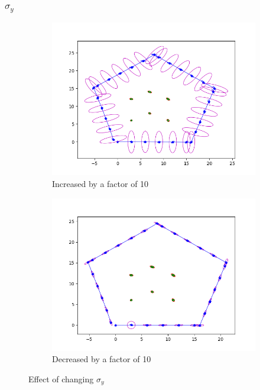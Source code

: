 \documentclass[12pt, a4paper]{article}
\begin{document}
\subsubsection{$\sigma_y$}
\begin{figure}[H]
  \centering
  \begin{subfigure}[b]{0.45\linewidth}
    \includegraphics[width=\linewidth]{./results/q3_2/result_y.png}
    \caption{Increased by a factor of 10}
  \end{subfigure}
  \hspace{0.5cm}
  \begin{subfigure}[b]{0.45\linewidth}
    \includegraphics[width=\linewidth]{./results/q3_2/result_y_dec.png}
    \caption{Decreased by a factor of 10}
  \end{subfigure}
  \caption{Effect of changing $\sigma_y$}
\end{figure}
\end{document}
